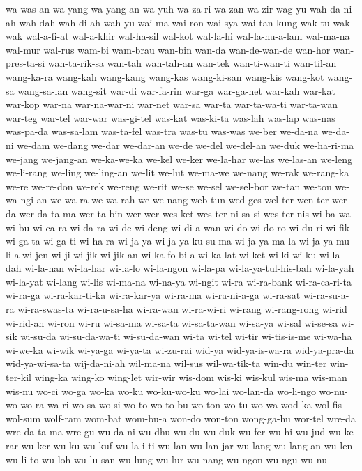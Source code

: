 {wa-was-an wa-yang wa-yang-an wa-yuh wa-za-ri wa-zan wa-zir wag-yu
wah-da-ni-ah wah-dah wah-di-ah wah-yu wai-ma wai-ron wai-sya wai-tan-kung
wak-tu wak-wak wal-a-fi-at wal-a-khir wal-ha-sil wal-kot wal-la-hi
wal-la-hu-a-lam wal-ma-na wal-mur wal-rus wam-bi wam-brau wan-bin wan-da
wan-de-wan-de wan-hor wan-pres-ta-si wan-ta-rik-sa wan-tah wan-tah-an
wan-tek wan-ti-wan-ti wan-til-an wang-ka-ra wang-kah wang-kang wang-kas
wang-ki-san wang-kis wang-kot wang-sa wang-sa-lan wang-sit war-di
war-fa-rin war-ga war-ga-net war-kah war-kat war-kop war-na war-na-war-ni
war-net war-sa war-ta war-ta-wa-ti war-ta-wan war-teg war-tel war-war
was-gi-tel was-kat was-ki-ta was-lah was-lap was-nas was-pa-da was-sa-lam
was-ta-fel was-tra was-tu was-was we-ber we-da-na we-da-ni we-dam we-dang
we-dar we-dar-an we-de we-del we-del-an we-duk we-ha-ri-ma we-jang
we-jang-an we-ka-we-ka we-kel we-ker we-la-har we-las we-las-an we-leng
we-li-rang we-ling we-ling-an we-lit we-lut we-ma-we we-nang we-rak
we-rang-ka we-re we-re-don we-rek we-reng we-rit we-se we-sel we-sel-bor
we-tan we-ton we-wa-ngi-an we-wa-ra we-wa-rah we-we-nang web-tun wed-ges
wel-ter wen-ter wer-da wer-da-ta-ma wer-ta-bin wer-wer wes-ket
wes-ter-ni-sa-si wes-ter-nis wi-ba-wa wi-bu wi-ca-ra wi-da-ra wi-de
wi-deng wi-di-a-wan wi-do wi-do-ro wi-du-ri wi-fik wi-ga-ta wi-ga-ti
wi-ha-ra wi-ja-ya wi-ja-ya-ku-su-ma wi-ja-ya-ma-la wi-ja-ya-mu-li-a wi-jen
wi-ji wi-jik wi-jik-an wi-ka-fo-bi-a wi-ka-lat wi-ket wi-ki wi-ku
wi-la-dah wi-la-han wi-la-har wi-la-lo wi-la-ngon wi-la-pa
wi-la-ya-tul-his-bah wi-la-yah wi-la-yat wi-lang wi-lis wi-ma-na wi-na-ya
wi-ngit wi-ra wi-ra-bank wi-ra-ca-ri-ta wi-ra-ga wi-ra-kar-ti-ka
wi-ra-kar-ya wi-ra-ma wi-ra-ni-a-ga wi-ra-sat wi-ra-su-a-ra wi-ra-swas-ta
wi-ra-u-sa-ha wi-ra-wan wi-ra-wi-ri wi-rang wi-rang-rong wi-rid wi-rid-an
wi-ron wi-ru wi-sa-ma wi-sa-ta wi-sa-ta-wan wi-sa-ya wi-sal wi-se-sa
wi-sik wi-su-da wi-su-da-wa-ti wi-su-da-wan wi-ta wi-tel wi-tir
wi-tis-is-me wi-wa-ha wi-we-ka wi-wik wi-ya-ga wi-ya-ta wi-zu-rai wid-ya
wid-ya-is-wa-ra wid-ya-pra-da wid-ya-wi-sa-ta wij-da-ni-ah wil-ma-na
wil-sus wil-wa-tik-ta win-du win-ter win-ter-kil wing-ka wing-ko wing-let
wir-wir wis-dom wis-ki wis-kul wis-ma wis-man wis-nu wo-ci wo-ga wo-ka
wo-ku wo-ku-wo-ku wo-lai wo-lan-da wo-li-ngo wo-nu-wo wo-ra-wa-ri wo-sa
wo-si wo-to wo-to-bu wo-ton wo-tu wo-wa wod-ka wol-fis wol-sum wolf-ram
wom-bat wom-bu-a won-do won-ton wong-ga-hu wor-tel wre-da wre-da-ta-ma
wre-gu wu-da-ni wu-dhu wu-du wu-duk wu-fer wu-hi wu-jud wu-ke-rar wu-ker
wu-ku wu-kuf wu-la-i-ti wu-lan wu-lan-jar wu-lang wu-lang-an wu-len
wu-li-to wu-loh wu-lu-san wu-lung wu-lur wu-nang wu-ngon wu-ngu wu-nu
}
